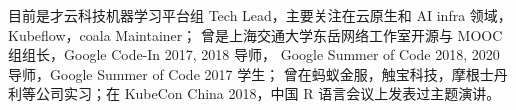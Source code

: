 

\begin{cvparagraph}
\begin{minipage}[t]{\textwidth}
目前是才云科技机器学习平台组 Tech Lead，主要关注在云原生和 AI infra 领域，Kubeflow，coala Maintainer；
曾是上海交通大学东岳网络工作室开源与 MOOC 组组长，Google Code-In 2017, 2018 导师，
Google Summer of Code 2018, 2020 导师，Google Summer of Code 2017 学生；
曾在蚂蚁金服，触宝科技，摩根士丹利等公司实习；在 KubeCon China 2018，中国 R 语言会议上发表过主题演讲。
\end{minipage}
\end{cvparagraph}
